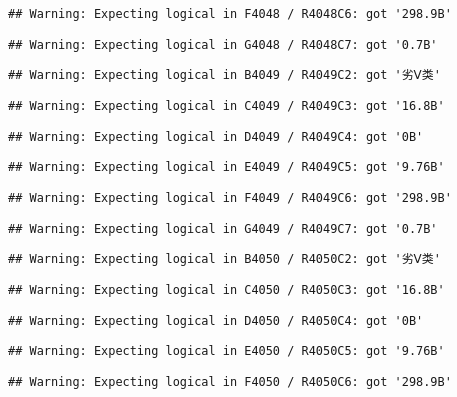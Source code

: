 \documentclass[
]{article}
\begin{document}
\begin{verbatim}
## Warning: Expecting logical in F4048 / R4048C6: got '298.9B'
\end{verbatim}

\begin{verbatim}
## Warning: Expecting logical in G4048 / R4048C7: got '0.7B'
\end{verbatim}

\begin{verbatim}
## Warning: Expecting logical in B4049 / R4049C2: got '劣Ⅴ类'
\end{verbatim}

\begin{verbatim}
## Warning: Expecting logical in C4049 / R4049C3: got '16.8B'
\end{verbatim}

\begin{verbatim}
## Warning: Expecting logical in D4049 / R4049C4: got '0B'
\end{verbatim}

\begin{verbatim}
## Warning: Expecting logical in E4049 / R4049C5: got '9.76B'
\end{verbatim}

\begin{verbatim}
## Warning: Expecting logical in F4049 / R4049C6: got '298.9B'
\end{verbatim}

\begin{verbatim}
## Warning: Expecting logical in G4049 / R4049C7: got '0.7B'
\end{verbatim}

\begin{verbatim}
## Warning: Expecting logical in B4050 / R4050C2: got '劣Ⅴ类'
\end{verbatim}

\begin{verbatim}
## Warning: Expecting logical in C4050 / R4050C3: got '16.8B'
\end{verbatim}

\begin{verbatim}
## Warning: Expecting logical in D4050 / R4050C4: got '0B'
\end{verbatim}

\begin{verbatim}
## Warning: Expecting logical in E4050 / R4050C5: got '9.76B'
\end{verbatim}

\begin{verbatim}
## Warning: Expecting logical in F4050 / R4050C6: got '298.9B'
\end{verbatim}
\end{document}
